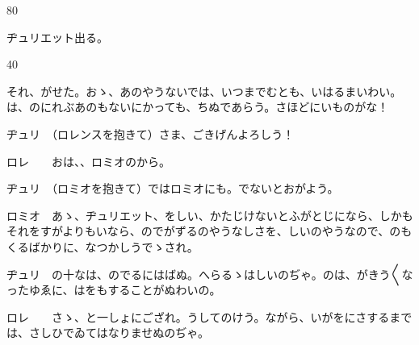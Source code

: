 \documentclass[tate,paper=b6j,jafontsize=9pt]{jlreq}
\begin{document}
\begin{azconvIndented}{8\zw}{0\zw}

ヂュリエット出る。

\end{azconvIndented}
\begin{azconvIndented}{4\zw}{0\zw}

それ、がせた。おゝ、あのやうないでは、いつまでむとも、いはるまいわい。は、のにれぶあのもないにかっても、ちぬであらう。さほどにいものがな！

ヂュリ　（ロレンスを抱きて）さま、ごきげんよろしう！

ロレ　　おは、、ロミオのから。

ヂュリ　（ロミオを抱きて）ではロミオにも。でないとおがよう。

ロミオ　あゝ、ヂュリエット、をしい、かたじけないとふがとじになら、しかもそれをすがよりもいなら、のでがずるのやうなしさを、しいのやうなので、のもくるばかりに、なつかしうでゝされ。

ヂュリ　の十なは、のでるにはばぬ。へらるゝはしいのぢゃ。のは、がきう{〳〵}なったゆゑに、はをもすることがぬわいの。

ロレ　　さゝ、と一しょにござれ。うしてのけう。ながら、いがをにさするまでは、さしひでゐてはなりませぬのぢゃ。

\end{azconvIndented}
\end{document}
